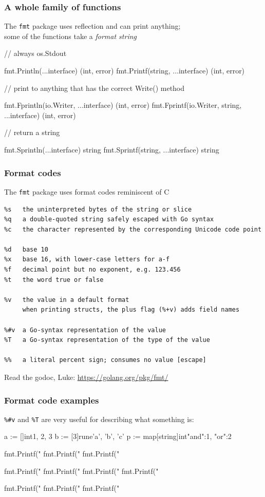 \documentclass[handout,compress,t,11pt]{beamer}
\begin{document}
\begin{frame}[fragile]
    \frametitle{A whole family of functions}
    The \verb|fmt| package uses reflection and can print anything; \\
    some of the functions take a {\em format string}
\begin{golang}
// always os.Stdout

fmt.Println(...interface{}) (int, error)
fmt.Printf(string, ...interface{}) (int, error)

// print to anything that has the correct Write() method

fmt.Fprintln(io.Writer, ...interface{}) (int, error)
fmt.Fprintf(io.Writer, string, ...interface{}) (int, error)

// return a string

fmt.Sprintln(...interface{}) string
fmt.Sprintf(string, ...interface{}) string
\end{golang}
\end{frame}

\begin{frame}[fragile]
    \frametitle{Format codes}
    The \verb|fmt| package uses format codes reminiscent of C
{\scriptsize\begin{verbatim}
%s   the uninterpreted bytes of the string or slice
%q   a double-quoted string safely escaped with Go syntax
%c   the character represented by the corresponding Unicode code point

%d   base 10
%x   base 16, with lower-case letters for a-f
%f   decimal point but no exponent, e.g. 123.456
%t   the word true or false

%v   the value in a default format
     when printing structs, the plus flag (%+v) adds field names

%#v  a Go-syntax representation of the value
%T   a Go-syntax representation of the type of the value

%%   a literal percent sign; consumes no value [escape]
\end{verbatim}}
Read the godoc, Luke: \href{https://golang.org/pkg/fmt/}{https://golang.org/pkg/fmt/}
\end{frame}

\begin{frame}[fragile]
    \frametitle{Format code examples}
    \verb|%#v| and \verb|%T| are very useful for describing what something is:
\begin{golang}
a := []int{1, 2, 3}
b := [3]rune{'a', 'b', 'c'}
p := map[string]int{"and":1, "or":2}

fmt.Printf("%
fmt.Printf("%
fmt.Printf("%

fmt.Printf("%
fmt.Printf("%
fmt.Printf("%
fmt.Printf("%

fmt.Printf("%
fmt.Printf("%
fmt.Printf("%
\end{golang}
\end{frame}
\end{document}
